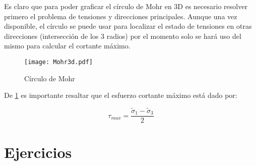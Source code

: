 \documentclass[../notas medios.tex]{subfiles}
\begin{document}
Es claro que para poder graficar el círculo de Mohr en 3D es necesario resolver primero el problema de tensiones y direcciones principales. Aunque una vez disponible, el círculo se puede usar para localizar el estado de tensiones en otras direcciones (intersección de los 3 radios) por el momento solo se hará uso del mismo para calcular el cortante máximo.


\begin{figure}[H]
\centering
	\texttt{[image: Mohr3d.pdf]}
	\caption{Círculo de Mohr}
	\label{Mohr3D}
\end{figure}

De \cref{Mohr3D} es importante resaltar que el esfuerzo cortante máximo está dado por:

\[\tau_{max} =\frac{{\tilde \sigma }_1 - {\tilde \sigma }_3}{2} \]


\section{Ejercicios}
\end{document}
